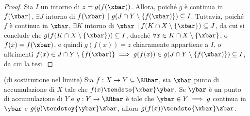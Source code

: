 \documentclass[11pt]{article}
\begin{document}
	\begin{proof}
		Sia $I$ un intorno di $z = g(f(\xbar))$. Allora, poiché $g$ è continua
		in $f(\xbar)$, $\exists J$ intorno di $f(\xbar)$ $\mid g(J \cap Y \setminus \{f(\xbar)\}) \subseteq
		I$. Tuttavia, poiché $f$ è continua in $\xbar$, $\exists K$ intorno
		di $\xbar$ $\mid f(K \cap X \setminus \{\xbar\}) \subseteq J$, da cui si conclude che
		$g(f(K \cap X \setminus \{\xbar\})) \subseteq I$, dacché $\forall x \in K \cap X \setminus \{\xbar\}$,
		o $f(x) = f(\xbar)$, e quindi $g(f(x)) = z$ chiaramente appartiene a $I$, o altrimenti
		$f(x) \in J \cap Y \setminus \{f(\xbar)\} \implies g(f(x)) \in g(J \cap Y \setminus \{f(\xbar)\}) \subseteq I$, da cui la tesi.
	\end{proof}

	\begin{theorem} (di sostituzione nel limite)
		Sia $f : X \to Y \subseteq \RRbar$, sia $\xbar$ punto di
		accumulazione di $X$ tale che $f(x) \tendsto{\xbar} \ybar$.
		Se $\ybar$ è un punto di accumulazione di $Y$ e $g : Y \to \RRbar$
		è tale che $\ybar \in Y \implies
		g$ continua in $\ybar$ e $g(y) \tendstoy{\ybar} \zbar$, allora
		$g(f(x)) \tendsto{\xbar} \zbar$.
	\end{theorem}
\end{document}
